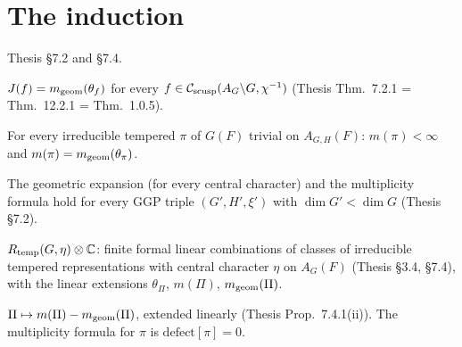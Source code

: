 \section{The induction}
Thesis \S7.2 and \S7.4.

\begin{definition}
\label{GeomAt}
\leanok
{}
$J(f)=m_{\mathrm{geom}}(\theta_f)$ for every $f\in\mathcal{C}_{\mathrm{scusp}}(A_G\backslash G,\chi^{-1})$ (Thesis Thm.~7.2.1 = Thm.~12.2.1 = Thm.~1.0.5).
\end{definition}

\begin{definition}
\label{MultAt}
\leanok
{}
For every irreducible tempered $\pi$ of $G(F)$ trivial on $A_{G,H}(F)$: $m(\pi)<\infty$ and
$m(\pi)=m_{\mathrm{geom}}(\theta_\pi)$.
\end{definition}

\begin{definition}
\label{HYP}
\leanok
{}
The geometric expansion (for every central character) and the multiplicity formula hold for every GGP
triple $(G',H',\xi')$ with $\dim G'<\dim G$ (Thesis \S7.2).
\end{definition}

\begin{definition}
\label{VirtualTemp}
\leanok
{}
$R_{\mathrm{temp}}(G,\eta)\otimes\mathbb C$: finite formal linear combinations of classes of irreducible tempered
representations with central character $\eta$ on $A_G(F)$ (Thesis \S3.4, \S7.4), with the linear extensions
$\theta_\Pi$, $m(\Pi)$, $m_{\mathrm{geom}}(\Pi)$.
\end{definition}

\begin{definition}
\label{defect}
\leanok
{}
$\Pi\mapsto m(\Pi)-m_{\mathrm{geom}}(\Pi)$, extended linearly (Thesis Prop.~7.4.1(ii)). The multiplicity formula
for $\pi$ is $\mathrm{defect}[\pi]=0$.
\end{definition}

